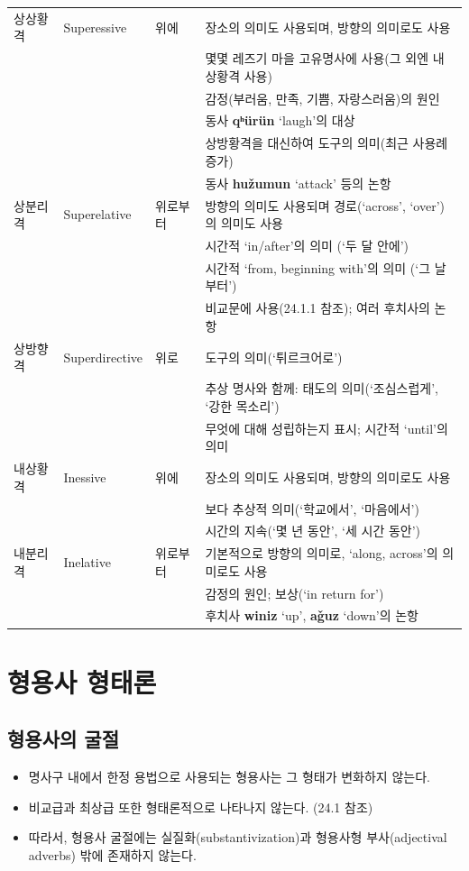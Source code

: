 \begin{table}[H]
\begin{center}
\begin{tabular}{llll}
\hline
상상황격	&Superessive	&위에	&장소의 의미도 사용되며, 방향의 의미로도 사용\\
&&&몇몇 레즈기 마을 고유명사에 사용(그 외엔 내상황격 사용)\\
&&&감정(부러움, 만족, 기쁨, 자랑스러움)의 원인\\
&&&동사 \textbf{qʰürün} `laugh'의 대상\\
&&&상방황격을 대신하여 도구의 의미(최근 사용례 증가)\\
&&&동사 \textbf{hužumun} `attack' 등의 논항\\
상분리격	&Superelative	&위로부터&방향의 의미도 사용되며 경로(`across', `over')의 의미도 사용\\
&&&시간적 `in/after'의 의미 (`두 달 안에')\\
&&&시간적 `from, beginning with'의 의미 (`그 날 부터')\\
&&&비교문에 사용(24.1.1 참조); 여러 후치사의 논항\\
상방향격	&Superdirective	&위로&도구의 의미(`튀르크어로')\\
&&&추상 명사와 함께: 태도의 의미(`조심스럽게', `강한 목소리')\\
&&&무엇에 대해 성립하는지 표시; 시간적 `until'의 의미\\

\hline
내상황격	&Inessive	&위에	&장소의 의미도 사용되며, 방향의 의미로도 사용\\
&&&보다 추상적 의미(`학교에서', `마음에서')\\
&&&시간의 지속(`몇 년 동안', `세 시간 동안')\\
내분리격	&Inelative	&위로부터&기본적으로 방향의 의미로, `along, across'의 의미로도 사용\\
&&&감정의 원인; 보상(`in return for')\\
&&&후치사 \textbf{winiz} `up', \textbf{a\v{g}uz} `down'의 논항\\

\hline
\end{tabular}
\end{center}
\end{table}

\section{형용사 형태론}
\subsection{형용사의 굴절}
\begin{itemize}
\item 명사구 내에서 한정 용법으로 사용되는 형용사는 그 형태가 변화하지 않는다.
\item 비교급과 최상급 또한 형태론적으로 나타나지 않는다. (24.1 참조)
\item 따라서, 형용사 굴절에는 실질화(substantivization)과 형용사형 부사(adjectival adverbs) 밖에 존재하지 않는다.
\end{itemize}

